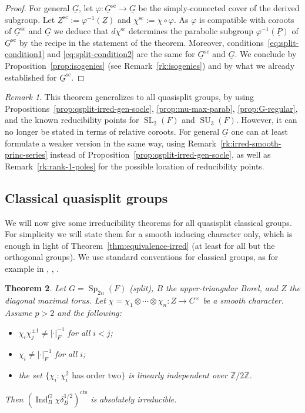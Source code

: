 \documentclass[a4paper]{amsart}
\numberwithin{equation}{section}
\newtheorem{thm}{Theorem}[section]
\theoremstyle{remark}
\newtheorem{remark}[thm]{Remark}
\theoremstyle{definition}
\DeclareMathOperator{\Ind}{Ind}
\newcommand{\Z}{\mathbb{Z}}
\DeclareMathOperator{\SL}{SL}
\DeclareMathOperator{\SU}{SU}
\DeclareMathOperator{\Sp}{Sp}
\newcommand{\alggrp}[1]{\underline{#1}}
\newcommand{\cts}{\mathrm{cts}}
\renewcommand{\sc}{\mathrm{sc}}
\begin{document}
\begin{proof}
  For general $\alggrp G$, let $\varphi \colon \alggrp G^\sc \to \alggrp G$ be the simply-connected cover of the derived subgroup.
  Let $\alggrp Z^\sc := \varphi^{-1}(\alggrp Z)$ and $\chi^\sc := \chi \circ \varphi$.
  As $\varphi$ is compatible with coroots of $\alggrp G^\sc$ and $\alggrp G$ we deduce that $d\chi^\sc$ determines the parabolic subgroup $\varphi^{-1}(\alggrp P)$ of $\alggrp G^\sc$ by the recipe in the statement of the theorem.
  Moreover, conditions~\eqref{eq:split-condition1} and \eqref{eq:split-condition2} are the same for $\alggrp G^\sc$ and $\alggrp G$.
  We conclude by Proposition~\ref{prop:isogenies} (see Remark~\ref{rk:isogenies}) and by what we already established for $\alggrp G^\sc$.
\end{proof}

\begin{remark}
  This theorem generalizes to all quasisplit groups, by using Propositions~\ref{prop:qsplit-irred-gen-socle}, \ref{prop:mu-max-parab}, \ref{prop:G-regular}, and the known reducibility points for $\SL_2(F)$ and $\SU_3(F)$.
  However, it can no longer be stated in terms of relative coroots.
  For general $\alggrp G$ one can at least formulate a weaker version in the same way, using Remark~\ref{rk:irred-smooth-princ-series} instead of Proposition~\ref{prop:qsplit-irred-gen-socle}, as well as Remark~\ref{rk:rank-1-poles} for the possible location of reducibility points.
\end{remark}

\subsection{Classical quasisplit groups}
\label{subsec:classical quasisplit groups}
We will now give some irreducibility theorems for all quasisplit classical groups.
For simplicity we will state them for a smooth inducing character only, which is enough in light of Theorem~\ref{thm:equivalence-irred} (at least for all but the orthogonal groups).
We use standard conventions for classical groups, as for example in \cite{MR1296726}, \cite{MR1224616}, \cite{MR3430367}.

\begin{thm}\label{thm:Sp2n-irred}
  Let $G = \Sp_{2n}(F)$ (split), $B$ the upper-triangular Borel, and $Z$ the diagonal maximal torus.
  Let $\chi = \chi_{1}\otimes\cdots\otimes\chi_{n}\colon Z\to C^{\times}$ be a smooth character.
  Assume $p > 2$ and the following:
  \begin{itemize}
  \item $\chi_i \chi_j^{\pm 1} \ne \lvert \cdot\rvert_F^{-1}$ for all $i < j$;
  \item $\chi_i \ne \lvert \cdot\rvert_F^{-1}$ for all $i$;
  \item the set $\{\chi_i : \text{$\chi_i^2$ has order two} \}$ is linearly independent over $\Z/2\Z$.   \end{itemize}
  Then $(\Ind_{B}^{G}\chi\delta_B^{1/2})^{\cts}$ is absolutely irreducible.
\end{thm}
\end{document}
